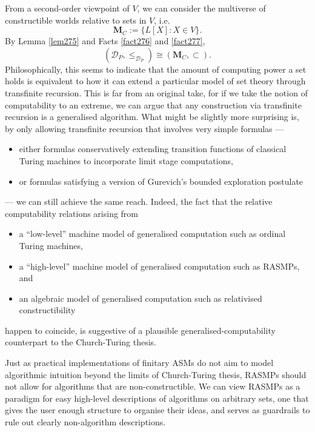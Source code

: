 \documentclass[12pt]{article}
\numberwithin{equation}{section}
\begin{document}
From a second-order viewpoint of $V$, we can consider the multiverse of constructible worlds relative to sets in $V$, i.e.
\begin{equation*}
    \mathbf{M}_C := \{L[X] : X \in V\} \text{.}
\end{equation*}
By Lemma \ref{lem275} and Facts \ref{fact276} and \ref{fact277}, 
\begin{equation*}
    (\mathcal{D}_P, \leq_{\mathcal{D}_P}) \cong (\mathbf{M}_C, \subset) \text{.}
\end{equation*}
Philosophically, this seems to indicate that the amount of computing power a set holds is equivalent to how it can extend a particular model of set theory through transfinite recursion. This is far from an original take, for if we take the notion of computability to an extreme, we can argue that any construction via transfinite recursion is a generalised algorithm. What might be slightly more surprising is, by only allowing transfinite recursion that involves very simple formulas ---
\begin{itemize}
    \item either formulas conservatively extending transition functions of classical Turing machines to incorporate limit stage computations,
    \item or formulas satisfying a version of Gurevich's bounded exploration postulate
\end{itemize}
--- we can still achieve the same reach. Indeed, the fact that the relative computability relations arising from
\begin{itemize}
    \item a ``low-level'' machine model of generalised computation such as ordinal Turing machines, 
    \item a ``high-level'' machine model of generalised computation such as RASMPs, and
    \item an algebraic model of generalised computation such as relativised constructibility
\end{itemize}
happen to coincide, is suggestive of a plausible generalised-computability counterpart to the Church-Turing thesis.

Just as practical implementations of finitary ASMs do not aim to model algorithmic intuition beyond the limits of Church-Turing thesis, RASMPs should not allow for algorithms that are non-constructible. We can view RASMPs as a paradigm for easy high-level descriptions of algorithms on arbitrary sets, one that gives the user enough structure to organise their ideas, and serves as guardrails to rule out clearly non-algorithm descriptions.
\end{document}
